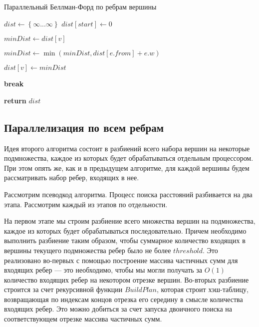 \FloatBarrier
\begin{algorithm}
\caption{Параллельный Беллман-Форд по ребрам вершины}\label{bf_classic_par1}
\begin{algorithmic}[1]
\State $dist\gets \left\{ {\infty ... \infty}\right\}$
\State $dist[start] \gets 0$
 
		\algrenewcommand{}
		\State $minDist \gets dist[v]$

		  
			\State $minDist \gets \min(minDist, dist[e.from] + e.w)$
		\EndFor	
					
			\State $dist[v] \gets minDist$  

		\EndIf

		\algrenewcommand{}

	\EndFor
		\State \textbf{break}
	\EndIf

\EndFor
\State \textbf{return} $dist$
\EndProcedure
\end{algorithmic}
\end{algorithm}

\FloatBarrier
\subsection{Параллелизация по всем ребрам}
Идея второго алгоритма состоит в разбиений всего набора вершин на некоторые подмножества, каждое из которых будет обрабатываться отдельным процессором. При этом опять же, как и в предыдущем алгоритме, для каждой вершины будем рассматривать набор ребер, входящих в нее. 

Рассмотрим псеводкод алгоритма. Процесс поиска расстояний разбивается на два этапа. Рассмотрим каждый из этапов по отдельности.

На первом этапе мы строим разбиение всего множества вершин на подмножества, каждое из которых будет обрабатываться последовательно. Причем необходимо выполнить разбиение таким образом, чтобы суммарное количество входящих в вершины текущего подмножества ребер было не более $threshold$.  Это реализовано во-первых с помощью построение массива частичных сумм для входящих ребер --- это необходимо, чтобы мы могли получать за $O(1)$ количество входящих ребер на некотором отрезке вершин. Во-вторых разбиение строится за счет рекурсивной функции $BuildPlan$, которая строит хэш-таблицу, возвращающая по индексам концов отрезка его середину в смысле количества входящих ребер. Это можно добиться за счет запуска двоичного поиска на соответствующем отрезке массива частичных сумм. 

